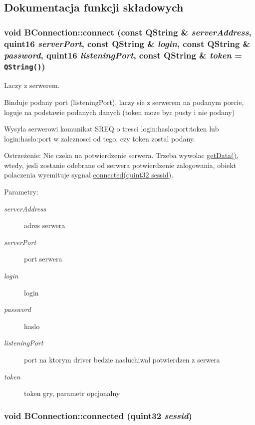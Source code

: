 \subsection{Dokumentacja funkcji składowych}
\hypertarget{class_b_connection_ac501a13f453169ed00bc3d4f8664040}{
\subsubsection[{connect}]{\setlength{\rightskip}{0pt plus 5cm}void BConnection::connect (const QString \& {\em serverAddress}, \/  quint16 {\em serverPort}, \/  const QString \& {\em login}, \/  const QString \& {\em password}, \/  quint16 {\em listeningPort}, \/  const QString \& {\em token} = {\tt QString()})}}
\label{class_b_connection_ac501a13f453169ed00bc3d4f8664040}


Laczy z serwerem. 

Binduje podany port (listeningPort), laczy sie z serwerem na podanym porcie, loguje na podstawie podanych danych (token moze byc pusty i nie podany)

Wysyla serwerowi komunikat SREQ o tresci login:haslo:port:token lub login:haslo:port w zaleznosci od tego, czy token zostal podany.

\begin{Desc}
\item[Ostrzeżenie:]Nie czeka na potwierdzenie serwera. Trzeba wywolac \hyperlink{class_b_connection_68fb4ff5ee98e5228378d08a2fe2ae19}{getData()}, wtedy, jesli zostanie odebrane od serwera potwierdzenie zalogowania, obiekt polaczenia wyemituje sygnal \hyperlink{class_b_connection_90dca3f0343427e31bb4544a8accf56d}{connected(quint32 sessid)}. \end{Desc}
\begin{Desc}
\item[Parametry:]
\begin{description}
\item[{\em serverAddress}]adres serwera \item[{\em serverPort}]port serwera \item[{\em login}]login \item[{\em password}]haslo \item[{\em listeningPort}]port na ktorym driver bedzie nasluchiwal potwierdzen z serwera \item[{\em token}]token gry, parametr opcjonalny \end{description}
\end{Desc}
\hypertarget{class_b_connection_90dca3f0343427e31bb4544a8accf56d}{
\subsubsection[{connected}]{\setlength{\rightskip}{0pt plus 5cm}void BConnection::connected (quint32 {\em sessid})}}
\label{class_b_connection_90dca3f0343427e31bb4544a8accf56d}


